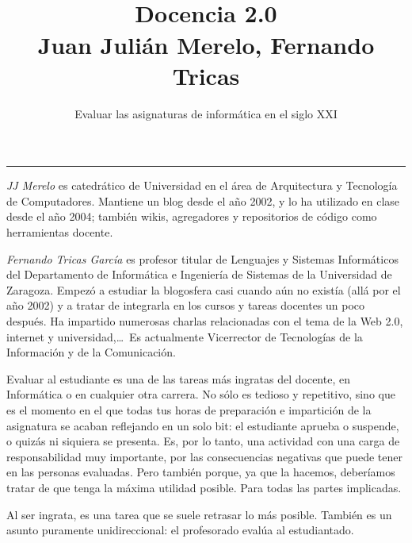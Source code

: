 \documentclass[twoside,10pt]{article}
\title{\ \\ Docencia 2.0\\ \large Juan Julián Merelo, Fernando Tricas}
\author{\LARGE Evaluar las asignaturas de informática en el siglo XXI}
\date{}
\newcounter{num}
\begin{document}
\addtocounter{page}{2}

\maketitle
\vspace*{-5ex}

\begin{multicols}{2}


\noindent\rule{86mm}{1pt}
\vspace{1ex} {\small{\begin{window} 
\noindent\emph{JJ Merelo} es catedrático de Universidad
en el área de Arquitectura y Tecnología de Computadores.
Mantiene un blog desde el año 2002, y lo ha utilizado en clase desde
el año 2004; también wikis, agregadores y repositorios de código
como herramientas docente. 
\end{window}}}

\medskip

{\small{\begin{window}
		\noindent \emph{Fernando Tricas García} es profesor
		titular de Lenguajes y Sistemas Informáticos del Departamento
		de Informática e Ingeniería de Sistemas de la Universidad de
		Zaragoza.  Empezó a estudiar la blogosfera casi cuando aún no
		existía (allá por el año 2002) y a tratar de integrarla en los
		cursos y tareas docentes un poco después.  Ha impartido
		numerosas charlas relacionadas con el tema de la Web 2.0, 
		internet y universidad,\ldots\ 
		Es actualmente Vicerrector de Tecnologías de la Información y
de la Comunicación.   
		\end{window}}}

Evaluar al estudiante es una de las tareas más ingratas del docente,
en Informática o en cualquier otra carrera. No sólo es tedioso y
repetitivo, sino que es el momento en el que todas tus horas de
preparación e impartición de la asignatura se acaban reflejando en un
solo bit: el estudiante aprueba o suspende, o quizás ni siquiera se
presenta.
Es, por lo tanto, una actividad con una carga de responsabilidad muy
	importante, por las consecuencias negativas que puede tener en las
	personas evaluadas. Pero también porque, ya que la hacemos,
        deberíamos tratar de que tenga la máxima utilidad
        posible. Para todas las partes implicadas. 

Al ser ingrata, es una tarea que se suele retrasar lo más
posible. También es un asunto puramente unidireccional: el profesorado
evalúa al estudiantado.


\end{multicols}
\end{document}
